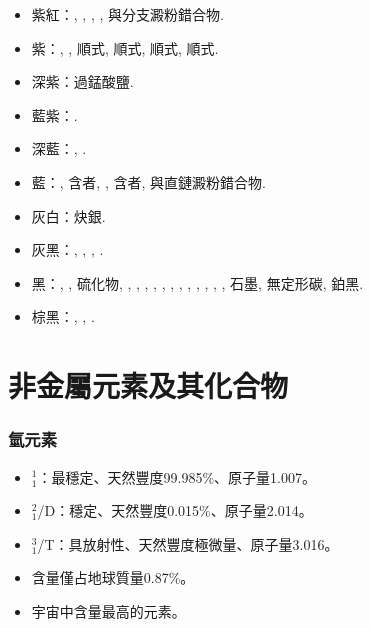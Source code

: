 \documentclass[a4paper,12pt]{report}
\begin{document}
\begin{itemize}
\item 紫紅：, \ce{[Cr(H2O)2Cl2]}, , , 與分支澱粉錯合物.
\item 紫：, , 順式\ce{[Cr(NH3)3Cl3]}, 順式, 順式\ce{[Co(NH3)3Cl3]}, 順式.
\item 深紫：過錳酸鹽.
\item 藍紫：.
\item 深藍：, .
\item 藍：, 含者, \ce{[Cr(H2O)4Cl2]}, 含者, 與直鏈澱粉錯合物.
\item 灰白：炔銀.
\item 灰黑：, , , .
\item 黑：, , 硫化物, , , , , , , , , , , , , 石墨, 無定形碳, 鉑黑.
\item 棕黑：, , .
\end{itemize}


\section{非金屬元素及其化合物}
\subsubsection{氫元素}
\begin{itemize}
\item {}$^1_1$\rmH：最穩定、天然豐度99.985\%、原子量1.007。
\item {}$^2_1$\rmH/D：穩定、天然豐度0.015\%、原子量2.014。
\item {}$^3_1$\rmH/T：具放射性、天然豐度極微量、原子量3.016。
\item 含量僅占地球質量0.87\%。
\item 宇宙中含量最高的元素。
\end{itemize}
\end{document}
